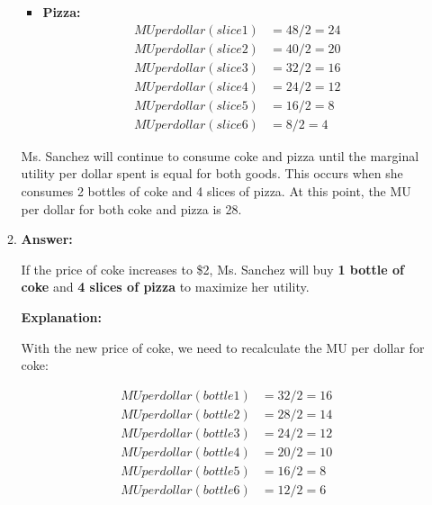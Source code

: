 \documentclass{article}
\begin{document}
\begin{enumerate}
\begin{enumerate}
\begin{itemize}
                        \item \textbf{Pizza:}
                              \begin{align*}
                                  MU per dollar (slice 1) & = 48 / 2 = 24 \\
                                  MU per dollar (slice 2) & = 40 / 2 = 20 \\
                                  MU per dollar (slice 3) & = 32 / 2 = 16 \\
                                  MU per dollar (slice 4) & = 24 / 2 = 12 \\
                                  MU per dollar (slice 5) & = 16 / 2 = 8  \\
                                  MU per dollar (slice 6) & = 8 / 2 = 4
                              \end{align*}
                    \end{itemize}

                    Ms. Sanchez will continue to consume coke and pizza until the marginal utility per dollar spent is equal for both goods. This occurs when she consumes 2 bottles of coke and 4 slices of pizza. At this point, the MU per dollar for both coke and pizza is 28.

              \item \textbf{Answer:}

                    If the price of coke increases to \$2, Ms. Sanchez will buy \textbf{1 bottle of coke} and \textbf{4 slices of pizza} to maximize her utility.

                    \textbf{Explanation:}

                    With the new price of coke, we need to recalculate the MU per dollar for coke:

                    \begin{align*}
                        MU per dollar (bottle 1) & = 32 / 2 = 16 \\
                        MU per dollar (bottle 2) & = 28 / 2 = 14 \\
                        MU per dollar (bottle 3) & = 24 / 2 = 12 \\
                        MU per dollar (bottle 4) & = 20 / 2 = 10 \\
                        MU per dollar (bottle 5) & = 16 / 2 = 8  \\
                        MU per dollar (bottle 6) & = 12 / 2 = 6
                    \end{align*}


\end{enumerate}
\end{enumerate}
\end{document}
